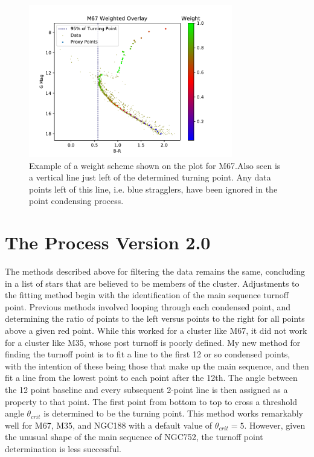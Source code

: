 \documentclass[aps,prb,twocolumn,groupedaddress,nofootinbib,floatfix]{revtex4-1}
\begin{document}
\begin{figure}[!h]
	\centering
      \includegraphics[width=3.5in]{weight.pdf}
	\caption{Example of a weight scheme shown on the plot for M67.Also seen is a vertical line just left of the determined turning point. Any data points left of this line, i.e. blue stragglers, have been ignored in the point condensing process.}
	\label{fig:weight}
\end{figure}

\section*{The Process Version 2.0}
The methods described above for filtering the data remains the same, concluding in a list of stars that are believed to be members of the cluster. Adjustments to the fitting method begin with the identification of the main sequence turnoff point. Previous methods involved looping through each condensed point, and determining the ratio of points to the left versus points to the right for all points above a given red point. While this worked for a cluster like M67, it did not work for a cluster like M35, whose post turnoff is poorly defined. My new method for finding the turnoff point is to fit a line to the first 12 or so condensed points, with the intention of these being those that make up the main sequence, and then fit a line from the lowest point to each point after the 12th. The angle between the 12 point baseline and every subsequent 2-point line is then assigned as a property to that point. The first point from bottom to top to cross a threshold angle $\theta_{crit}$ is determined to be the turning point. This method works remarkably well for M67, M35, and NGC188 with a default value of $\theta_{crit} = 5$. However, given the unusual shape of the main sequence of NGC752, the turnoff point determination is less successful.
\end{document}
